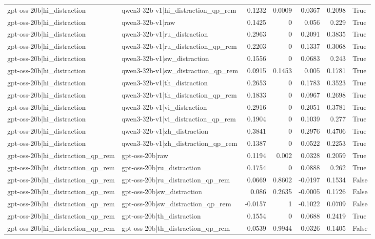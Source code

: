 \begin{table}
\begin{tabular}{l l r r r r l}
gpt-oss-20b|hi_distraction & qwen3-32b-v1|hi_distraction_qp_rem & 0.1232 & 0.0009 & 0.0367 & 0.2098 & True \\
gpt-oss-20b|hi_distraction & qwen3-32b-v1|raw & 0.1425 & 0 & 0.056 & 0.229 & True \\
gpt-oss-20b|hi_distraction & qwen3-32b-v1|ru_distraction & 0.2963 & 0 & 0.2091 & 0.3835 & True \\
gpt-oss-20b|hi_distraction & qwen3-32b-v1|ru_distraction_qp_rem & 0.2203 & 0 & 0.1337 & 0.3068 & True \\
gpt-oss-20b|hi_distraction & qwen3-32b-v1|sw_distraction & 0.1556 & 0 & 0.0683 & 0.243 & True \\
gpt-oss-20b|hi_distraction & qwen3-32b-v1|sw_distraction_qp_rem & 0.0915 & 0.1453 & 0.005 & 0.1781 & True \\
gpt-oss-20b|hi_distraction & qwen3-32b-v1|th_distraction & 0.2653 & 0 & 0.1783 & 0.3523 & True \\
gpt-oss-20b|hi_distraction & qwen3-32b-v1|th_distraction_qp_rem & 0.1833 & 0 & 0.0967 & 0.2698 & True \\
gpt-oss-20b|hi_distraction & qwen3-32b-v1|vi_distraction & 0.2916 & 0 & 0.2051 & 0.3781 & True \\
gpt-oss-20b|hi_distraction & qwen3-32b-v1|vi_distraction_qp_rem & 0.1904 & 0 & 0.1039 & 0.277 & True \\
gpt-oss-20b|hi_distraction & qwen3-32b-v1|zh_distraction & 0.3841 & 0 & 0.2976 & 0.4706 & True \\
gpt-oss-20b|hi_distraction & qwen3-32b-v1|zh_distraction_qp_rem & 0.1387 & 0 & 0.0522 & 0.2253 & True \\
gpt-oss-20b|hi_distraction_qp_rem & gpt-oss-20b|raw & 0.1194 & 0.002 & 0.0328 & 0.2059 & True \\
gpt-oss-20b|hi_distraction_qp_rem & gpt-oss-20b|ru_distraction & 0.1754 & 0 & 0.0888 & 0.262 & True \\
gpt-oss-20b|hi_distraction_qp_rem & gpt-oss-20b|ru_distraction_qp_rem & 0.0669 & 0.8602 & -0.0197 & 0.1534 & False \\
gpt-oss-20b|hi_distraction_qp_rem & gpt-oss-20b|sw_distraction & 0.086 & 0.2635 & -0.0005 & 0.1726 & False \\
gpt-oss-20b|hi_distraction_qp_rem & gpt-oss-20b|sw_distraction_qp_rem & -0.0157 & 1 & -0.1022 & 0.0709 & False \\
gpt-oss-20b|hi_distraction_qp_rem & gpt-oss-20b|th_distraction & 0.1554 & 0 & 0.0688 & 0.2419 & True \\
gpt-oss-20b|hi_distraction_qp_rem & gpt-oss-20b|th_distraction_qp_rem & 0.0539 & 0.9944 & -0.0326 & 0.1405 & False \\

\end{tabular}
\end{table}
